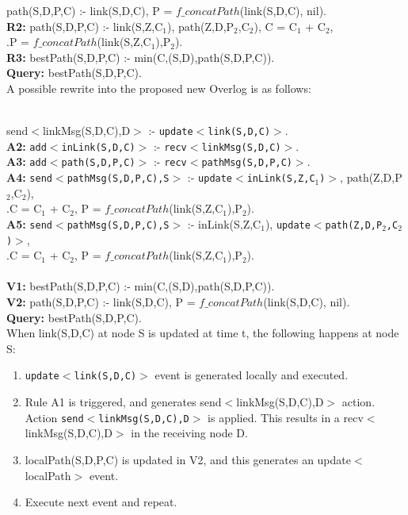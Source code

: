 \documentclass{article}
\newcommand{\code}[1]{{\tt \small #1}}
\newcommand{\datalogspace}{\textcolor[gray]{1}{.}\hspace{0.8in}}
\begin{document}
 path(S,D,P,C) :- link(S,D,C), P = $f\_concatPath$(link(S,D,C), nil). \\
{\bf R2: } path(S,D,P,C) :- link(S,Z,C$_{1}$),
path(Z,D,P$_{2}$,C$_{2}$), C = C$_{1}$ + C$_{2}$,\\
\datalogspace P = $f\_concatPath$(link(S,Z,C$_{1}$),P$_{2}$).\\
{\bf R3: } bestPath(S,D,P,C) :- min(C,(S,D),path(S,D,P,C)). \\
{\bf Query: } bestPath(S,D,P,C).\\

A possible rewrite into the proposed new Overlog is as follows:

\\
 send$<$linkMsg(S,D,C),D$>$ :- \code{update$<$link(S,D,C)$>$}.\\
{{\bf A2:} \code{add$<$inLink(S,D,C)$>$} :- \code{recv$<$linkMsg(S,D,C)$>$}.\\
{\bf A3:} \code{add$<$path(S,D,P,C)$>$} :- \code{recv$<$pathMsg(S,D,P,C)$>$}.\\
{\bf A4:} \code{send$<$pathMsg(S,D,P,C),S$>$} :- \code{update$<$inLink(S,Z,C$_{1}$)$>$}, path(Z,D,P$_{2}$,C$_{2}$), \\
\datalogspace C = C$_{1}$ + C$_{2}$, P =
$f\_concatPath$(link(S,Z,C$_{1}$),P$_{2}$).\\
{\bf A5:} \code{send$<$pathMsg(S,D,P,C),S$>$} :- inLink(S,Z,C$_{1}$), \code{update$<$path(Z,D,P$_{2}$,C$_{2}$)$>$}, \\
\datalogspace C = C$_{1}$ + C$_{2}$, P =
$f\_concatPath$(link(S,Z,C$_{1}$),P$_{2}$).\\

\\
{\bf V1:} bestPath(S,D,P,C) :- min(C,(S,D),path(S,D,P,C)). \\
\bf V2:} path(S,D,P,C) :- link(S,D,C), P = $f\_concatPath$(link(S,D,C), nil). \\
{\bf Query: } bestPath(S,D,P,C).\\

When link(S,D,C) at node S is updated at time t, the following happens
at node S:

\begin{enumerate}
\item \code{update$<$link(S,D,C)$>$} event is generated locally and executed.
\item Rule A1 is triggered, and generates send$<$linkMsg(S,D,C),D$>$
  action. Action \code{send$<$linkMsg(S,D,C),D$>$} is applied. This
  results in a recv$<$linkMsg(S,D,C),D$>$ in the receiving node D.
\item localPath(S,D,P,C) is updated in V2, and this generates an
  update$<$localPath$>$ event.
\item Execute next event and repeat.
\end{enumerate}
\end{document}
